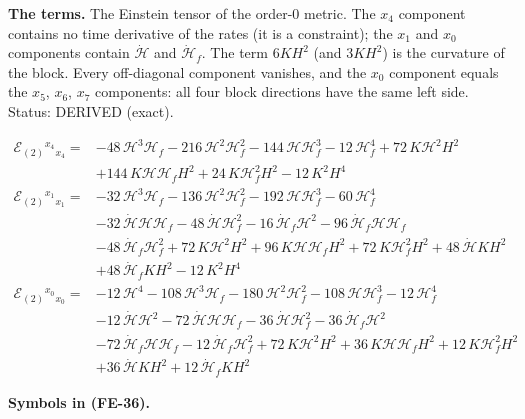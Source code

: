 \documentclass[
  10pt,
]{article}
\begin{document}
\textbf{The terms.} The Einstein tensor of the order-0 metric. The
\(x_4\) component contains no time derivative of the rates (it is a
constraint); the \(x_1\) and \(x_0\) components contain
\(\dot{\mathcal{H}}\) and \(\dot{\mathcal{H}}_f\). The term \(6KH^2\)
(and \(3KH^2\)) is the curvature of the block. Every off-diagonal
component vanishes, and the \(x_0\) component equals the \(x_5\),
\(x_6\), \(x_7\) components: all four block directions have the same
left side. Status: DERIVED (exact).

\[
\begin{aligned}
\mathcal{E}_{(2)}{}^{x_4}{}_{x_4} ={}& -48\,\mathcal{H}^{3}\mathcal{H}_f -
 216\,\mathcal{H}^{2}\mathcal{H}_f^{2} - 144\,\mathcal{H}\mathcal{H}_f^{3} - 12\,\mathcal{H}_f^{4} +
 72\,K\mathcal{H}^{2}H^{2} \\
 &+ 144\,K\mathcal{H}\mathcal{H}_fH^{2} + 24\,K\mathcal{H}_f^{2}H^{2} - 12\,K^{2}H^{4} \\
\mathcal{E}_{(2)}{}^{x_1}{}_{x_1} ={}& -32\,\mathcal{H}^{3}\mathcal{H}_f -
 136\,\mathcal{H}^{2}\mathcal{H}_f^{2} - 192\,\mathcal{H}\mathcal{H}_f^{3} - 60\,\mathcal{H}_f^{4} \\
 &- 32\,\dot{\mathcal{H}}\mathcal{H}\mathcal{H}_f - 48\,\dot{\mathcal{H}}\mathcal{H}_f^{2} -
 16\,\dot{\mathcal{H}}_f\mathcal{H}^{2} - 96\,\dot{\mathcal{H}}_f\mathcal{H}\mathcal{H}_f \\
 &- 48\,\dot{\mathcal{H}}_f\mathcal{H}_f^{2} + 72\,K\mathcal{H}^{2}H^{2} +
 96\,K\mathcal{H}\mathcal{H}_fH^{2} + 72\,K\mathcal{H}_f^{2}H^{2} + 48\,\dot{\mathcal{H}}KH^{2} \\
 &+ 48\,\dot{\mathcal{H}}_fKH^{2} - 12\,K^{2}H^{4} \\
\mathcal{E}_{(2)}{}^{x_0}{}_{x_0} ={}& -12\,\mathcal{H}^{4} - 108\,\mathcal{H}^{3}\mathcal{H}_f -
 180\,\mathcal{H}^{2}\mathcal{H}_f^{2} - 108\,\mathcal{H}\mathcal{H}_f^{3} - 12\,\mathcal{H}_f^{4} \\
 &- 12\,\dot{\mathcal{H}}\mathcal{H}^{2} - 72\,\dot{\mathcal{H}}\mathcal{H}\mathcal{H}_f -
 36\,\dot{\mathcal{H}}\mathcal{H}_f^{2} - 36\,\dot{\mathcal{H}}_f\mathcal{H}^{2} \\
 &- 72\,\dot{\mathcal{H}}_f\mathcal{H}\mathcal{H}_f - 12\,\dot{\mathcal{H}}_f\mathcal{H}_f^{2} +
 72\,K\mathcal{H}^{2}H^{2} + 36\,K\mathcal{H}\mathcal{H}_fH^{2} + 12\,K\mathcal{H}_f^{2}H^{2} \\
 &+ 36\,\dot{\mathcal{H}}KH^{2} + 12\,\dot{\mathcal{H}}_fKH^{2}
\end{aligned} \tag{FE-36}
\]

\textbf{Symbols in (FE-36).}
\end{document}
